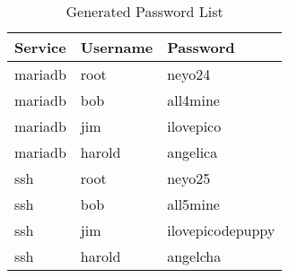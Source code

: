 \begin{table}[h!]
\centering
\footnotesize
\begin{tabularx}{0.5\textwidth}{|>{\raggedright\arraybackslash}X|>{\raggedright\arraybackslash}X|>{\raggedright\arraybackslash}X|}
\hline
\textbf{Service} & \textbf{Username} & \textbf{Password} \\
\hline
mariadb & root    & neyo24           \\
mariadb & bob     & all4mine         \\
mariadb & jim     & ilovepico        \\
mariadb & harold  & angelica         \\
ssh     & root    & neyo25           \\
ssh     & bob     & all5mine         \\
ssh     & jim     & ilovepicodepuppy \\
ssh     & harold  & angelcha         \\
\hline
\end{tabularx}
\caption{Generated Password List}
\label{tab:envtools}
\end{table}
